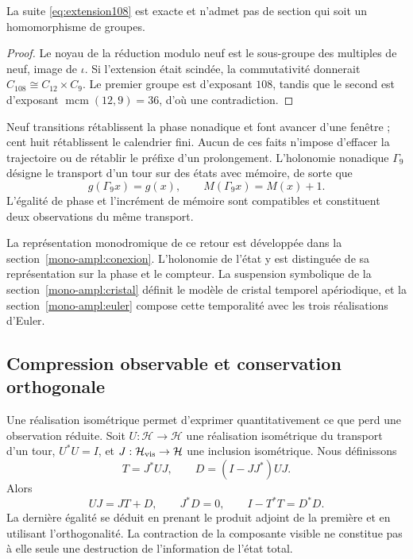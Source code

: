 \begin{proposition}
La suite \eqref{eq:extension108} est exacte et n’admet pas de section qui soit un homomorphisme de groupes.
\end{proposition}
\begin{proof}
Le noyau de la réduction modulo neuf est le sous-groupe des multiples de neuf, image de \(\iota\). Si l’extension était scindée, la commutativité donnerait \(C_{108}\cong C_{12}\times C_9\). Le premier groupe est d’exposant \(108\), tandis que le second est d’exposant \(\operatorname{mcm}(12,9)=36\), d’où une contradiction.
\end{proof}

Neuf transitions rétablissent la phase nonadique et font avancer d’une fenêtre ; cent huit rétablissent le calendrier fini. Aucun de ces faits n’impose d’effacer la trajectoire ou de rétablir le préfixe d’un prolongement. L’holonomie nonadique \(\Gamma_9\) désigne le transport d’un tour sur des états avec mémoire, de sorte que
\begin{equation}
 g(\Gamma_9x)=g(x),\qquad M(\Gamma_9x)=M(x)+1.
 \label{eq:holonomia-memoria}
\end{equation}
L’égalité de phase et l’incrément de mémoire sont compatibles et constituent deux observations du même transport.



La représentation monodromique de ce retour est développée dans la
section~\ref{mono-ampl:conexion}. L’holonomie de
l’état y est distinguée de sa représentation sur la phase et le compteur. La suspension
symbolique de la section~\ref{mono-ampl:cristal} définit le modèle de
cristal temporel apériodique, et la section~\ref{mono-ampl:euler}
compose cette temporalité avec les trois réalisations d’Euler.

\subsection{Compression observable et conservation orthogonale}

Une réalisation isométrique permet d’exprimer quantitativement ce que perd une observation réduite. Soit \(U:\mathcal H\to\mathcal H\) une réalisation isométrique du transport d’un tour, \(U^*U=I\), et \(J:\mathcal H_{\rm vis}\to\mathcal H\) une inclusion isométrique. Nous définissons
\[
 T=J^*UJ,\qquad D=(I-JJ^*)UJ.
\]
Alors
\begin{equation}
 UJ=JT+D,\qquad J^*D=0,\qquad I-T^*T=D^*D.
 \label{eq:conservacion-ortogonal}
\end{equation}
La dernière égalité se déduit en prenant le produit adjoint de la première et en utilisant l’orthogonalité. La contraction de la composante visible ne constitue pas à elle seule une destruction de l’information de l’état total.

